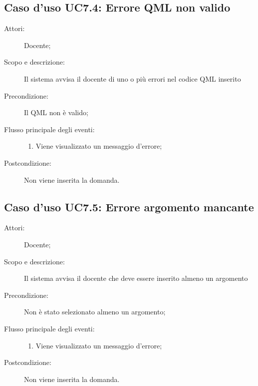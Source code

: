 \subsection{Caso d'uso UC7.4: Errore QML non valido}\begin{description}
\item[Attori:] Docente;
\item[Scopo e descrizione:] Il sistema avvisa il docente di uno o più errori nel codice QML inserito
      \item[Precondizione:] Il QML non è valido;

        \item[Flusso principale degli eventi:] \begin{enumerate}
          \item Viene visualizzato un messaggio d'errore;

      \end{enumerate}
    \item[Postcondizione:] Non viene inserita la domanda.
  \end{description}
\hypertarget{UC7.5}{}
\subsection{Caso d'uso UC7.5: Errore argomento mancante}\begin{description}
\item[Attori:] Docente;
\item[Scopo e descrizione:] Il sistema avvisa il docente che deve essere inserito almeno un argomento
      \item[Precondizione:] Non è stato selezionato almeno un argomento;

        \item[Flusso principale degli eventi:] \begin{enumerate}
          \item Viene visualizzato un messaggio d'errore;

      \end{enumerate}
    \item[Postcondizione:] Non viene inserita la domanda.
  \end{description}
\hypertarget{UC7.6}{}
